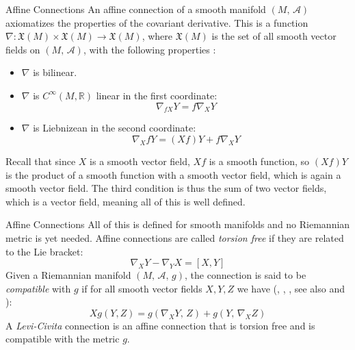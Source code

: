 \documentclass{beamer}
\begin{document}
    \begin{frame}{Affine Connections}
        An affine connection of a smooth manifold $(M,\,\mathcal{A})$
        axiomatizes the properties of the covariant derivative. This is a
        function
        $\nabla:\mathfrak{X}(M)\times\mathfrak{X}(M)\rightarrow\mathfrak{X}(M)$,
        where $\mathfrak{X}(M)$ is the set of all smooth vector fields on
        $(M,\,\mathcal{A})$, with the following properties
        \cite[p.~116]{MukherjeeDifferentialTopology}:
        \begin{itemize}
            \item $\nabla$ is bilinear.
            \item $\nabla$ is $C^{\infty}(M,\mathbb{R})$ linear in the first
                coordinate:
                \begin{equation}
                    \nabla_{fX}Y=f\nabla_{X}Y
                \end{equation}
            \item $\nabla$ is Liebnizean in the second coordinate:
                \begin{equation}
                    \nabla_{X}fY=(Xf)Y+f\nabla_{X}Y
                \end{equation}
        \end{itemize}
        Recall that since $X$ is a smooth vector field, $Xf$ is a smooth
        function, so $(Xf)Y$ is the product of a smooth function with a smooth
        vector field, which is again a smooth vector field. The third condition
        is thus the sum of two vector fields, which is a vector field, meaning
        all of this is well defined.
    \end{frame}
    \begin{frame}{Affine Connections}
        All of this is defined for smooth manifolds and no Riemannian metric is
        yet needed. Affine connections are called \textit{torsion free} if they
        are related to the Lie bracket:
        \begin{equation}
            \nabla_{X}Y-\nabla_{Y}X=[X,Y]
        \end{equation}
        Given a Riemannian manifold $(M,\,\mathcal{A},\,g)$, the connection is
        said to be \textit{compatible} with $g$ if for all smooth vector fields
        $X,Y,Z$ we have
        (\cite[p.~54]{DoCarmoRiemmanianGemoetry},
        \cite[p.~118]{LeeRiemannianManifolds},
        \cite[p.~218-219]{McInerneyDifferentialGeometry},
        see also \cite[p.~160]{JostRiemannianGeometryAndGeometricAnalysis}
        and \cite[p.~118]{MukherjeeDifferentialTopology}):
        \begin{equation}
            Xg(Y,Z)=g(\nabla_{X}Y,\,Z)+g(Y,\,\nabla_{X}Z)
        \end{equation}
        A \textit{Levi-Civita} connection is an affine connection that is
        torsion free and is compatible with the metric $g$.
    \end{frame}
\end{document}
